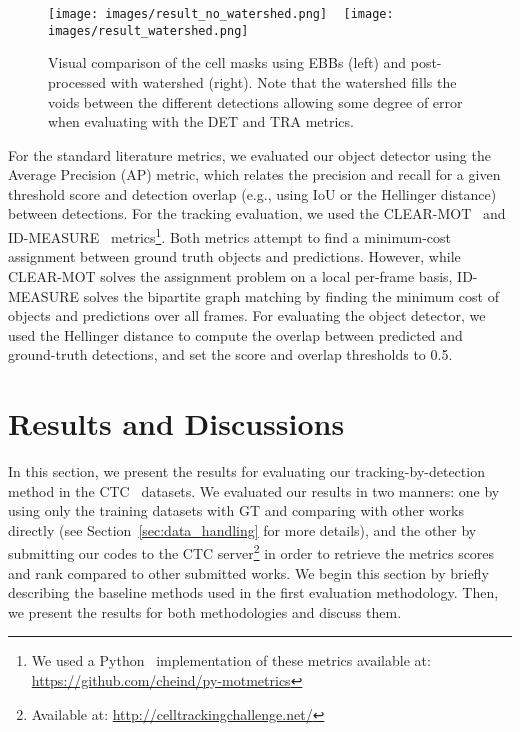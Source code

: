 \documentclass{article}
\begin{document}
\begin{figure}[]
\centering
\texttt{[image: images/result\_no\_watershed.png]} ~
\texttt{[image: images/result\_watershed.png]}
\caption{Visual comparison of the cell masks using EBBs (left) and post-processed with watershed (right). Note that the watershed fills the voids between the different detections allowing some degree of error when evaluating with the DET and TRA metrics.}
\label{fig:watershed}
\end{figure}

For the standard literature metrics, we evaluated our object detector using the Average Precision (AP) metric, which relates the precision and recall for a given threshold score and detection overlap (e.g., using IoU or the Hellinger distance) between detections. For the tracking evaluation, we used the CLEAR-MOT~\cite{mota,mot16} and ID-MEASURE~\cite{mota_id} metrics\footnote{We used a Python~\cite{python} implementation of these metrics available at: \url{https://github.com/cheind/py-motmetrics}}. Both metrics attempt to find a minimum-cost assignment between ground truth objects and predictions. However, while CLEAR-MOT solves the assignment problem on a local per-frame basis, ID-MEASURE solves the bipartite graph matching by finding the minimum cost of objects and predictions over all frames. For evaluating the object detector, we used the Hellinger distance to compute the overlap between predicted and ground-truth detections, and set the score and overlap thresholds to 0.5.

\section{Results and Discussions}\label{sec:results}

In this section, we present the results for evaluating our tracking-by-detection method in the CTC~\cite{isbi} datasets. We evaluated our results in two manners: one by using only the training datasets with GT and comparing with other works directly (see Section~\ref{sec:data_handling} for more details), and the other by submitting our codes to the CTC server\footnote{Available at: \url{http://celltrackingchallenge.net/}} in order to retrieve the metrics scores and rank compared to other submitted works. We begin this section by briefly describing the baseline methods used in the first evaluation methodology. Then, we present the results for both methodologies and discuss them.
\end{document}
